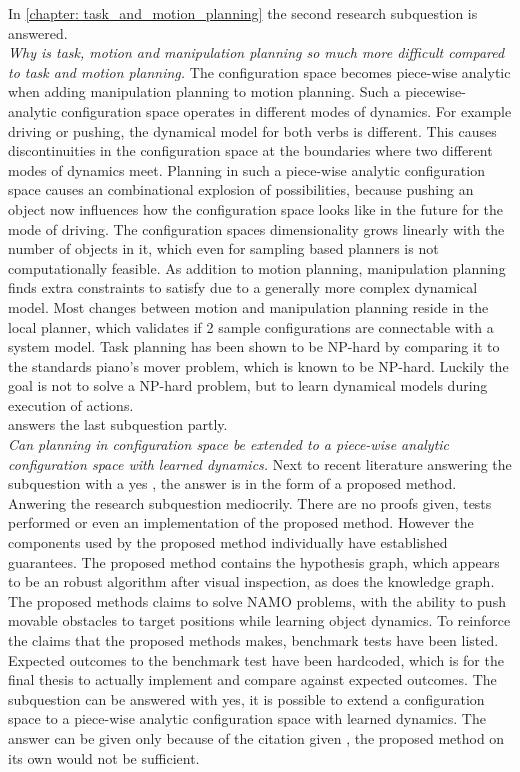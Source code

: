 In \cref{chapter: task_and_motion_planning} the second research subquestion is answered.\\

\textit{Why is task, motion and manipulation planning so much more difficult compared to task and motion planning.} The configuration space becomes piece-wise analytic when adding manipulation planning to motion planning. Such a piecewise-analytic configuration space operates in different modes of dynamics. For example driving or pushing, the dynamical model for both verbs is different. This causes discontinuities in the configuration space at the boundaries where two different modes of dynamics meet. Planning in such a piece-wise analytic configuration space causes an combinational explosion of possibilities, because pushing an object now influences how the configuration space looks like in the future for the mode of driving. The configuration spaces dimensionality grows linearly with the number of objects in it, which even for sampling based planners is not computationally feasible. As addition to motion planning, manipulation planning finds extra constraints to satisfy due to a generally more complex dynamical model. Most changes between motion and manipulation planning reside in the local planner, which validates if 2 sample configurations are connectable with a system model. Task planning has been shown to be NP-hard by comparing it to the standards piano's mover problem, which is known to be NP-hard. Luckily the goal is not to solve a NP-hard problem, but to learn dynamical models during execution of actions. \\

 answers the last subquestion partly.\\

\textit{Can planning in configuration space be extended to a piece-wise analytic configuration space with learned dynamics.} Next to recent literature answering the subquestion with a yes \cite{sabbagh_novin_model_2021}, the answer is in the form of a proposed method. Anwering the research subquestion mediocrily. There are no proofs given, tests performed or even an implementation of the proposed method. However the components used by the proposed method individually have established guarantees. The proposed method contains the hypothesis graph, which appears to be an robust algorithm after visual inspection, as does the knowledge graph. The proposed methods claims to solve \ac{NAMO} problems, with the ability to push movable obstacles to target positions while learning object dynamics. To reinforce the claims that the proposed methods makes, benchmark tests have been listed. Expected outcomes to the benchmark test have been hardcoded, which is for the final thesis to actually implement and compare against expected outcomes. The subquestion can be answered with yes, it is possible to extend a configuration space to a piece-wise analytic configuration space with learned dynamics. The answer can be given only because of the citation given \cite{sabbagh_novin_model_2021}, the proposed method on its own would not be sufficient. \\

